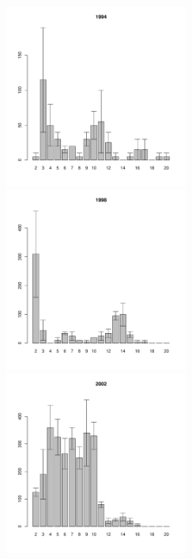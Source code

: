	\begin{figure}[hp]

	\begin{minipage}[b]{.3\linewidth}
	\begin{center}
	\includegraphics[width=60mm]{../White_Sea/Ryashkov_ZRS/zrs2_1994_.pdf}	
	\end{center}
	\end{minipage}
	\hfil %
	\begin{minipage}[b]{.3\linewidth}
	\begin{center}
	\includegraphics[width=60mm]{../White_Sea/Ryashkov_ZRS/zrs2_1998_.pdf}
	\end{center}
	\end{minipage}
	\hfil %
	\begin{minipage}[b]{.3\linewidth}
	\begin{center}
\includegraphics[width=60mm]{../White_Sea/Ryashkov_ZRS/zrs2_2002_.pdf}

\end{center}
\end{minipage}
\end{figure}
